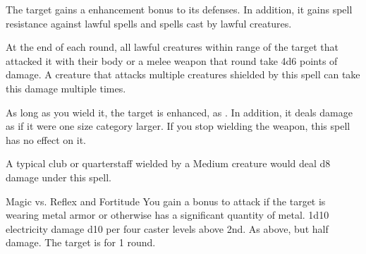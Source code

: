 \begin{spellheader}
    \spelldur{\durshort \dismissable}
\end{spellheader}
\begin{spelleffects}
    The target gains a  enhancement bonus to its defenses. In addition, it gains spell resistance against lawful spells and spells cast by lawful creatures.
    \par At the end of each round, all lawful creatures within \rngclose range of the target that attacked it with their body or a melee weapon that round take 4d6 points of damage. A creature that attacks multiple creatures shielded by this spell can take this damage multiple times.
\end{spelleffects}
\begin{spellfooter}

\end{spellfooter}

\begin{spellheader}
    \spelldur{\durshort}
\end{spellheader}
\begin{spelleffects}
    \spelleffect As long as you wield it, the target is enhanced, as . In addition, it deals damage as if it were one size category larger. If you stop wielding the weapon, this spell has no effect on it.
\end{spelleffects}
\begin{spellfooter}
    \spellnotes A typical club or quarterstaff wielded by a Medium creature would deal d8 damage under this spell.
\end{spellfooter}

\begin{spellheader}
\end{spellheader}
\begin{spelleffects}
    \begin{spellattack}{Magic vs. Reflex and Fortitude}
        \spellspecial You gain a  bonus to attack if the target is wearing metal armor or otherwise has a significant quantity of metal.
        \spellsuccess[Reflex] 1d10 electricity damage \add d10 per four caster levels above 2nd.
        \spellfailure[Reflex] As above, but half damage.
         The target is \staggered for 1 round.
    \end{spellattack}
\end{spelleffects}
\begin{spellfooter}

\end{spellfooter}

